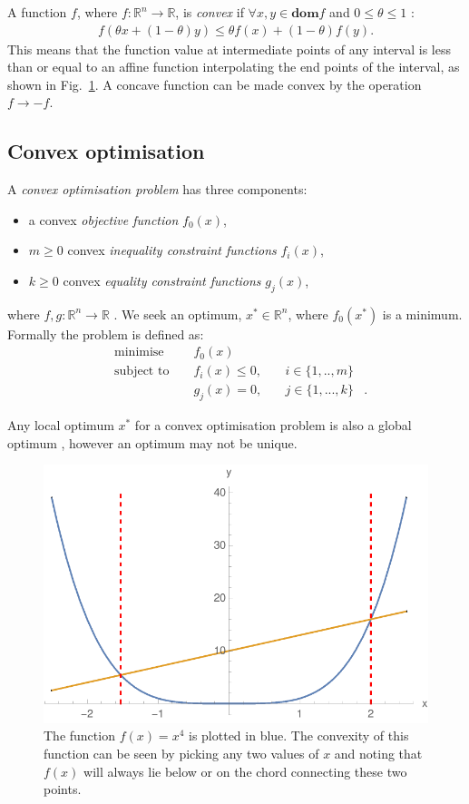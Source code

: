 \documentclass[twocolumn,secnumarabic,amssymb, nobibnotes, aps, prl,superscriptaddress]{revtex4-1}
\begin{document}
\noindent A function $f$, where $f:\mathbb{R}^n \rightarrow \mathbb{R}$, is \textit{convex} if $\forall x,y\in \textbf{dom} f$ and $0 \leqslant \theta \leqslant 1$ \cite[p.67]{cvxpybook}:
\begin{align}
f(\theta x + (1-\theta)y) \leqslant \theta f(x)+(1-\theta)f(y).
\end{align}
This means that the function value at intermediate points of any interval is less than or equal to an affine function interpolating the end points of the interval, as shown in Fig.~\ref{fig:convex}. A concave function can be made convex by the operation $f\to-f$.

\subsection{Convex optimisation}
\noindent A \textit{convex optimisation problem} has three components:
\begin{itemize}
\item a convex \textit{objective function} $f_0(x)$,
\item $m\geqslant0$ convex \textit{inequality constraint functions} $f_i(x)$,
\item $k\geqslant0$ convex \textit{equality constraint functions} $g_j(x)$, 
\end{itemize}
where $f,g: \mathbb{R}^n \rightarrow \mathbb{R}$ \cite[p.141]{cvxpybook}. We seek an optimum, $x^*\in \mathbb{R}^n$, where $f_0(x^*)$ is a minimum. Formally the problem is defined as:
\begin{align} \label{eq:cvxdefn}
&\text{minimise } && f_0(x) & \nonumber &\\
&\text{subject to } && f_i(x) \leqslant 0,\quad & i\in \{1,..,m\}\nonumber &\\
& && g_{j}(x)=0,\quad & j\in \{1,...,k\} &.
\end{align}

Any local optimum $x^*$ for a convex optimisation problem is also a global optimum \cite[pp.138-139]{cvxpybook}, however an optimum may not be unique.

\begin{figure}[h!]
\includegraphics[width=0.9\linewidth]{convex_function.pdf}
\caption{\label{fig:convex}The function $f(x)=x^4$ is plotted in blue. The convexity of this function can be seen by picking any two values of $x$ and noting that $f(x)$ will always lie below or on the chord connecting these two points.} 
\end{figure}
\end{document}
